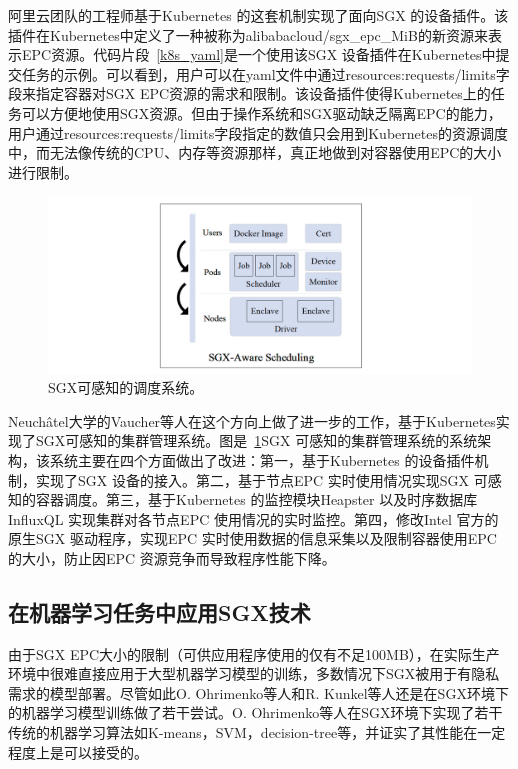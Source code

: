 阿里云团队的工程师基于Kubernetes 的这套机制实现了面向SGX 的设备插件。该插件在Kubernetes中定义了一种被称为alibabacloud/sgx\_epc\_MiB的新资源来表示EPC资源。代码片段~\ref{k8s_yaml}是一个使用该SGX 设备插件在Kubernetes中提交任务的示例。可以看到，用户可以在yaml文件中通过resources:requests/limits字段来指定容器对SGX EPC资源的需求和限制。该设备插件使得Kubernetes上的任务可以方便地使用SGX资源。但由于操作系统和SGX驱动缺乏隔离EPC的能力，用户通过resources:requests/limits字段指定的数值只会用到Kubernetes的资源调度中，而无法像传统的CPU、内存等资源那样，真正地做到对容器使用EPC的大小进行限制。

\begin{figure}[h]
    \centerline{\includegraphics[width=\textwidth]{figures/sgx-aware-sche.png}}
    \caption{SGX可感知的调度系统。}
    \label{sgx_aware_sche}
\end{figure}

Neuchâtel大学的Vaucher等人在这个方向上做了进一步的工作，基于Kubernetes实现了SGX可感知的集群管理系统。图是~\ref{sgx_aware_sche}SGX 可感知的集群管理系统的系统架构，该系统主要在四个方面做出了改进：第一，基于Kubernetes 的设备插件机制，实现了SGX 设备的接入。第二，基于节点EPC 实时使用情况实现SGX 可感知的容器调度。第三，基于Kubernetes 的监控模块Heapster 以及时序数据库InfluxQL 实现集群对各节点EPC 使用情况的实时监控。第四，修改Intel 官方的原生SGX 驱动程序，实现EPC 实时使用数据的信息采集以及限制容器使用EPC 的大小，防止因EPC 资源竞争而导致程序性能下降。

\subsection{在机器学习任务中应用SGX技术}
由于SGX EPC大小的限制（可供应用程序使用的仅有不足100MB），在实际生产环境中很难直接应用于大型机器学习模型的训练，多数情况下SGX被用于有隐私需求的模型部署。尽管如此O. Ohrimenko等人\parencite{197247}和R. Kunkel\parencite{kunkel2019tensorscone}等人还是在SGX环境下的机器学习模型训练做了若干尝试。O. Ohrimenko等人在SGX环境下实现了若干传统的机器学习算法如K-means，SVM，decision-tree等，并证实了其性能在一定程度上是可以接受的。

